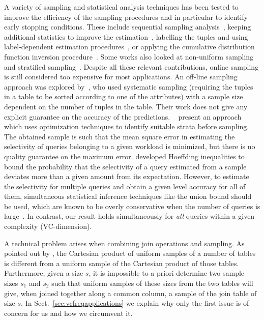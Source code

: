 A variety of sampling and statistical analysis techniques has been tested to 
improve the efficiency of the sampling procedures and in particular
to identify early stopping conditions. These include sequential sampling
analysis~\citep{HouOD91,HaasS92}, keeping additional statistics to improve the
estimation~\citep{HaasS95}, labelling the tuples and using label-dependent
estimation procedures~\citep{GangulyGMS96}, or applying the cumulative distribution
function inversion procedure~\citep{WuAE01}. Some works also looked at non-uniform
sampling~\citep{BabcockCD03,EstanN06} and stratified
sampling~\citep{ChaudhuriDN07,JoshiJ08}. Despite all these relevant
contributions, online sampling is still considered too expensive for most
applications. An off-line sampling approach was explored by~\citet{NguHS04}, who
used systematic sampling (requiring the tuples in a table to be sorted according
to one of the attributes) with a sample size dependent on the number of tuples
in the table. Their work does not give any explicit guarantee on the accuracy of
the predictions.  ~\citet{ChaudhuriDN07} present an approach which uses
optimization techniques to identify suitable strata before sampling. The
obtained sample is such that the mean square error in estimating the selectivity
of queries belonging to a given workload is minimized, but there is no quality
guarantee on the maximum error. \citet{Haas96} developed Hoeffding inequalities
to bound the probability that the selectivity of a query estimated from a sample
deviates more than a given amount from its expectation.  However, to estimate
the selectivity for multiple queries and obtain a given level accuracy for all
of them, simultaneous statistical inference techniques like the union bound
should be used, which are known to be overly conservative when the number of
queries is large~\citep{Miller81}. In contrast, our result holds simultaneously
for \emph{all} queries within a given complexity (VC-dimension). 

A technical problem arises when combining join operations and sampling. As
pointed out by \citet{ChaudhuriMN99}, the Cartesian product of uniform samples
of a number of tables is different from a uniform sample of the Cartesian
product of those tables. Furthermore, given a size $s$, it is impossible to a
priori determine two sample sizes $s_1$ and $s_2$ such that uniform samples of
these sizes from the two tables will give, when joined together along a common
column, a sample of the join table of size $s$. In
Sect.~\ref{sec:vcfreqapplications} we explain why only the first issue is of
concern for us and how we circumvent it.

